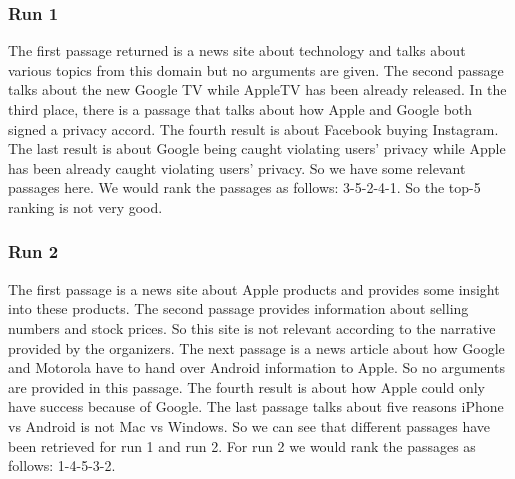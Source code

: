         \subsubsection*{Run 1}
            The first passage returned is a news site about technology and talks about various topics from this domain but no arguments are given. The second passage talks about the new Google TV while AppleTV has been already released. In the third place, there is a passage that talks about how Apple and Google both signed a privacy accord. The fourth result is about Facebook buying Instagram. The last result is about Google being caught violating users' privacy while Apple has been already caught violating users' privacy. So we have some relevant passages here. We would rank the passages as follows: 3-5-2-4-1. So the top-5 ranking is not very good. 
        \subsubsection*{Run 2}
            The first passage is a news site about Apple products and provides some insight into these products. The second passage provides information about selling numbers and stock prices. So this site is not relevant according to the narrative provided by the organizers. The next passage is a news article about how Google and Motorola have to hand over Android information to Apple. So no arguments are provided in this passage. The fourth result is about how Apple could only have success because of Google.  The last passage talks about five reasons iPhone vs Android is not Mac vs Windows. So we can see that different passages have been retrieved for run 1 and run 2. For run 2 we would rank the passages as follows: 1-4-5-3-2.